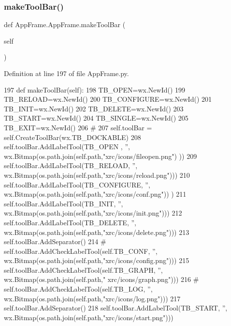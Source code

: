 \subsubsection{\texorpdfstring{make\+Tool\+Bar()}{makeToolBar()}}
{\footnotesize\ttfamily def App\+Frame.\+App\+Frame.\+make\+Tool\+Bar (\begin{DoxyParamCaption}\item[{}]{self }\end{DoxyParamCaption})}



Definition at line 197 of file App\+Frame.\+py.


\begin{DoxyCode}
197     \textcolor{keyword}{def }makeToolBar(self):
198         TB\_OPEN=wx.NewId()
199         TB\_RELOAD=wx.NewId()
200         TB\_CONFIGURE=wx.NewId()
201         TB\_INIT=wx.NewId()
202         TB\_DELETE=wx.NewId()
203         TB\_START=wx.NewId()
204         TB\_SINGLE=wx.NewId()
205         TB\_EXIT=wx.NewId()
206         \textcolor{comment}{#}
207         self.toolBar = self.CreateToolBar(wx.TB\_DOCKABLE)
208         self.toolBar.AddLabelTool(TB\_OPEN  , \textcolor{stringliteral}{''}, wx.Bitmap(os.path.join(self.path,\textcolor{stringliteral}{"xrc/icons/fileopen.png"})
      ))
209         self.toolBar.AddLabelTool(TB\_RELOAD, \textcolor{stringliteral}{''}, wx.Bitmap(os.path.join(self.path,\textcolor{stringliteral}{"xrc/icons/reload.png"})))
210         self.toolBar.AddLabelTool(TB\_CONFIGURE, \textcolor{stringliteral}{''}, wx.Bitmap(os.path.join(self.path,\textcolor{stringliteral}{"xrc/icons/conf.png"}))
      )
211         self.toolBar.AddLabelTool(TB\_INIT, \textcolor{stringliteral}{''}, wx.Bitmap(os.path.join(self.path,\textcolor{stringliteral}{"xrc/icons/init.png"})))
212         self.toolBar.AddLabelTool(TB\_DELETE, \textcolor{stringliteral}{''}, wx.Bitmap(os.path.join(self.path,\textcolor{stringliteral}{"xrc/icons/delete.png"})))
213         self.toolBar.AddSeparator()
214 \textcolor{comment}{#        self.toolBar.AddCheckLabelTool(self.TB\_CONF, '',
       wx.Bitmap(os.path.join(self.path,"xrc/icons/config.png")))}
215         self.toolBar.AddCheckLabelTool(self.TB\_GRAPH, \textcolor{stringliteral}{''}, wx.Bitmap(os.path.join(self.path,\textcolor{stringliteral}{"
      xrc/icons/graph.png"})))
216 \textcolor{comment}{#        self.toolBar.AddCheckLabelTool(self.TB\_LOG, '',
       wx.Bitmap(os.path.join(self.path,"xrc/icons/log.png")))}
217         self.toolBar.AddSeparator()
218         self.toolBar.AddLabelTool(TB\_START, \textcolor{stringliteral}{''}, wx.Bitmap(os.path.join(self.path,\textcolor{stringliteral}{"xrc/icons/start.png"})))

\end{DoxyCode}
